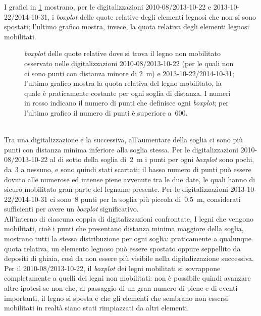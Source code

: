 I grafici in \cref{graph:elementi-dem-detrended-distanza} mostrano, per le digitalizzazioni 2010-08/2013-10-22 e 2013-10-22/2014-10-31, i \emph{boxplot} delle quote relative degli elementi legnosi che non si sono spostati;
l'ultimo grafico mostra, invece, la quota relativa degli elementi legnosi mobilitati.
%
\begin{figure}
	\centering
	
	\caption[\emph{boxplot} delle quote relative dove si trova il legno non mobilitato e mobilitato]{\emph{boxplot} delle quote relative dove si trova il legno non mobilitato osservato nelle digitalizzazioni 2010-08/2013-10-22 (per le quali non ci sono punti con distanza minore di \SI{2}{\m}) e 2013-10-22/2014-10-31; l'ultimo grafico mostra la quota relativa del legno mobilitato, la quale è praticamente costante per ogni soglia di distanza.
	I numeri in rosso indicano il numero di punti che definisce ogni \emph{boxplot}; per l'ultimo grafico il numero di punti è superiore a~\num{600}.}
	\label{graph:elementi-dem-detrended-distanza}
\end{figure}
%
\\
Tra una digitalizzazione e la successiva, all'aumentare della soglia ci sono più punti con distanza minima inferiore alla soglia stessa.
Per le digitalizzazioni 2010-08/2013-10-22 al di sotto della soglia di~\SI{2}{\m} i punti per ogni \emph{boxplot} sono pochi, da~3 a nessuno, e sono quindi stati scartati; il basso numero di punti può essere dovuto alle numerose ed intense piene avvenute tra le due date, le quali hanno di sicuro mobilitato gran parte del legname presente.
Per le digitalizzazioni 2013-10-22/2014-10-31 ci sono~8 punti per la soglia più piccola di~\SI{0.5}{\m}, considerati sufficienti per avere un \emph{boxplot} significativo.
\\
All'interno di ciascuna coppia di digitalizzazioni confrontate, I legni che vengono mobilitati, cioè i punti che presentano distanza minima maggiore della soglia, mostrano tutti la stessa distribuzione per ogni soglia: praticamente a qualunque quota relativa, un elemento legnoso può essere spostato oppure seppellito da depositi di ghiaia, così da non essere più visibile nella digitalizzazione successiva.
\\
Per il 2010-08/2013-10-22, il \emph{boxplot} dei legni mobilitati si sovrappone completamente a quelli dei legni non mobilitati: non è possibile quindi avanzare altre ipotesi se non che, al passaggio di un gran numero di piene e di eventi importanti, il legno si sposta e che gli elementi che sembrano non essersi mobilitati in realtà siano stati rimpiazzati da altri elementi.
